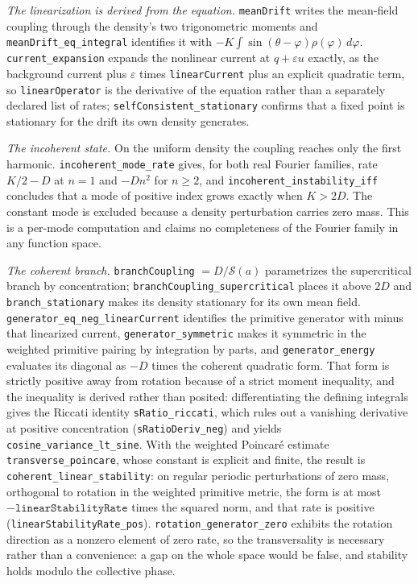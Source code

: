 \documentclass{article}
\begin{document}
\textit{The linearization is derived from the equation.} \texttt{meanDrift} writes the mean-field coupling through the density's two trigonometric moments and \nolinkurl{meanDrift_eq_integral} identifies it with $-K\int\sin(\theta-\varphi)\rho(\varphi)\,d\varphi$. \nolinkurl{current_expansion} expands the nonlinear current at $q + \varepsilon u$ exactly, as the background current plus $\varepsilon$ times \texttt{linearCurrent} plus an explicit quadratic term, so \texttt{linearOperator} is the derivative of the equation rather than a separately declared list of rates; \nolinkurl{selfConsistent_stationary} confirms that a fixed point is stationary for the drift its own density generates.

\textit{The incoherent state.} On the uniform density the coupling reaches only the first harmonic. \nolinkurl{incoherent_mode_rate} gives, for both real Fourier families, rate $K/2 - D$ at $n = 1$ and $-Dn^{2}$ for $n \ge 2$, and \nolinkurl{incoherent_instability_iff} concludes that a mode of positive index grows exactly when $K > 2D$. The constant mode is excluded because a density perturbation carries zero mass. This is a per-mode computation and claims no completeness of the Fourier family in any function space.

\textit{The coherent branch.} \texttt{branchCoupling} $= D/\mathcal{S}(a)$ parametrizes the supercritical branch by concentration; \nolinkurl{branchCoupling_supercritical} places it above $2D$ and \nolinkurl{branch_stationary} makes its density stationary for its own mean field. \nolinkurl{generator_eq_neg_linearCurrent} identifies the primitive generator with minus that linearized current, \nolinkurl{generator_symmetric} makes it symmetric in the weighted primitive pairing by integration by parts, and \nolinkurl{generator_energy} evaluates its diagonal as $-D$ times the coherent quadratic form. That form is strictly positive away from rotation because of a strict moment inequality, and the inequality is derived rather than posited: differentiating the defining integrals gives the Riccati identity \nolinkurl{sRatio_riccati}, which rules out a vanishing derivative at positive concentration (\nolinkurl{sRatioDeriv_neg}) and yields \nolinkurl{cosine_variance_lt_sine}. With the weighted Poincar\'e estimate \nolinkurl{transverse_poincare}, whose constant is explicit and finite, the result is \nolinkurl{coherent_linear_stability}: on regular periodic perturbations of zero mass, orthogonal to rotation in the weighted primitive metric, the form is at most $-\texttt{linearStabilityRate}$ times the squared norm, and that rate is positive (\nolinkurl{linearStabilityRate_pos}). \nolinkurl{rotation_generator_zero} exhibits the rotation direction as a nonzero element of zero rate, so the transversality is necessary rather than a convenience: a gap on the whole space would be false, and stability holds modulo the collective phase.
\end{document}
